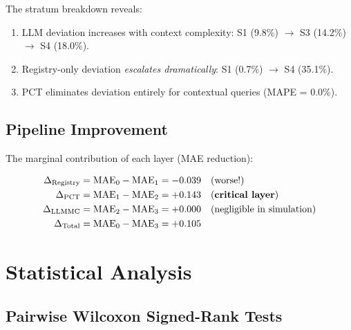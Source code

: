 The stratum breakdown reveals:
\begin{enumerate}
\item LLM deviation increases with context complexity:
  S1 (9.8\%) $\to$ S3 (14.2\%) $\to$ S4 (18.0\%).
\item Registry-only deviation \emph{escalates dramatically}:
  S1 (0.7\%) $\to$ S4 (35.1\%).
\item PCT eliminates deviation entirely for contextual queries (MAPE = 0.0\%).
\end{enumerate}

\subsection{Pipeline Improvement}

The marginal contribution of each layer (MAE reduction):

\begin{equation}
\begin{aligned}
\Delta_{\text{Registry}} &= \text{MAE}_0 - \text{MAE}_1 = -0.039 \quad \text{(worse!)} \\
\Delta_{\text{PCT}} &= \text{MAE}_1 - \text{MAE}_2 = +0.143 \quad \text{(\textbf{critical layer})} \\
\Delta_{\text{LLMMC}} &= \text{MAE}_2 - \text{MAE}_3 = +0.000 \quad \text{(negligible in simulation)} \\
\Delta_{\text{Total}} &= \text{MAE}_0 - \text{MAE}_3 = +0.105
\end{aligned}
\end{equation}



\section{Statistical Analysis}
\label{sec:lb-statistics}

\subsection{Pairwise Wilcoxon Signed-Rank Tests}

